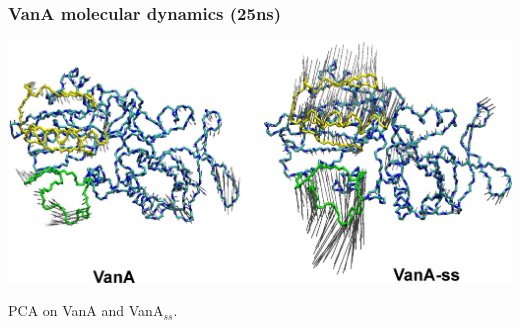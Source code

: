 \begin{frame}
    \frametitle{VanA molecular dynamics (25ns)}
    \includegraphics[width=\textwidth]{figures/PCA-2etats.png}

    PCA on VanA and VanA$_{ss}$.
\end{frame}
